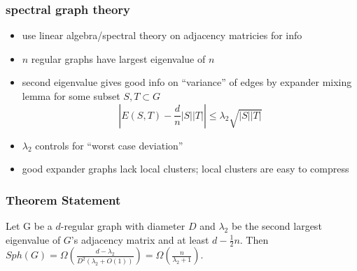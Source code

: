 \documentclass{beamer}
\begin{document}
\begin{frame}
    \frametitle{spectral graph theory}
    \begin{itemize}
        \item use linear algebra/spectral theory on adjacency matricies for info
        \item \(n\) regular graphs have largest eigenvalue of \(n\)
        \item second eigenvalue gives good info on ``variance'' of edges by expander mixing lemma
        for some subset \(S,T\subset G\)
        \begin{equation}
            \left| E(S, T) - \frac{d}{n} |S||T| \right| \leq \lambda_2 \sqrt{|S||T|}
        \end{equation}
        \item \(\lambda_2\) controls for ``worst case deviation''
        \item good expander graphs lack local clusters; local clusters are easy to compress
    \end{itemize}
\end{frame}

\begin{frame}
    \frametitle{Theorem Statement}
    \begin{theorem}
        Let G be a \(d\)-regular graph with diameter \(D\) and \(\lambda_2\) be the second largest eigenvalue of \(G\)'s adjacency matrix and at least \(d-\frac{1}{2}n\). Then \(Sph(G)=\Omega\left( \frac{d-\lambda_2}{D^2(\lambda_2+O(1))} \right)= \Omega(\frac{n}{\lambda_2+1})\).
    \end{theorem}
    

\end{frame}
\end{document}
